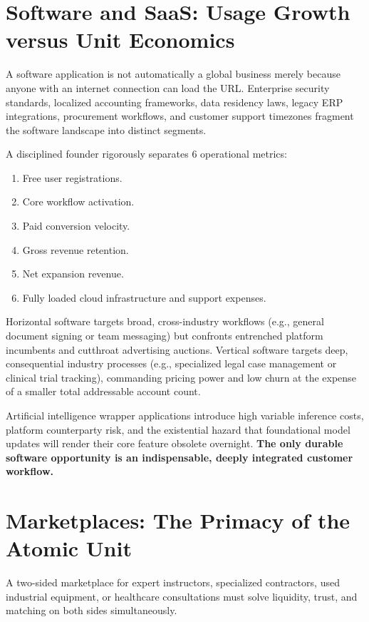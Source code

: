 \section{Software and SaaS: Usage Growth versus Unit Economics}

A software application is not automatically a global business merely because anyone with an internet connection can load the URL. Enterprise security standards, localized accounting frameworks, data residency laws, legacy ERP integrations, procurement workflows, and customer support timezones fragment the software landscape into distinct segments.

A disciplined founder rigorously separates 6 operational metrics:
\begin{enumerate}[leftmargin=12pt,itemsep=1pt,topsep=1pt,parsep=0pt]
  \item Free user registrations.
  \item Core workflow activation.
  \item Paid conversion velocity.
  \item Gross revenue retention.
  \item Net expansion revenue.
  \item Fully loaded cloud infrastructure and support expenses.
\end{enumerate}

Horizontal software targets broad, cross-industry workflows (e.g., general document signing or team messaging) but confronts entrenched platform incumbents and cutthroat advertising auctions. Vertical software targets deep, consequential industry processes (e.g., specialized legal case management or clinical trial tracking), commanding pricing power and low churn at the expense of a smaller total addressable account count.

Artificial intelligence wrapper applications introduce high variable inference costs, platform counterparty risk, and the existential hazard that foundational model updates will render their core feature obsolete overnight. \textbf{The only durable software opportunity is an indispensable, deeply integrated customer workflow.}

\section{Marketplaces: The Primacy of the Atomic Unit}

A two-sided marketplace for expert instructors, specialized contractors, used industrial equipment, or healthcare consultations must solve liquidity, trust, and matching on both sides simultaneously.


